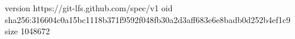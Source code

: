 version https://git-lfs.github.com/spec/v1
oid sha256:316604c0a15bc1118b371f9592f048fb30a2d3aff683e6e8badb0d252b4ef1c9
size 1048672
